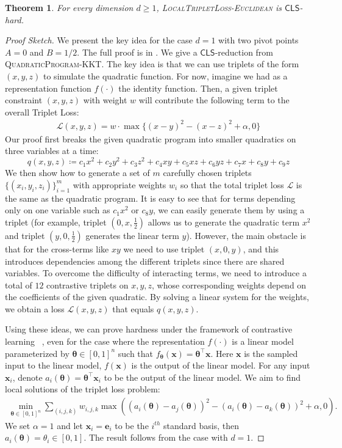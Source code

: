 \documentclass{article}
\theoremstyle{definition}  %
\theoremstyle{plain}
\newtheorem{theorem}{Theorem}
\numberwithin{observation}{section}
\numberwithin{claim}{section}
\numberwithin{fact}{section}
\numberwithin{lemma}{section}
\numberwithin{proposition}{section}
\numberwithin{theorem}{section}
\numberwithin{corollary}{section}
\numberwithin{definition}{section}
\def\ve{{\bm{e}}}
\def\vx{{\bm{x}}}
\newcommand{\vtheta}{\boldsymbol{\theta} }
\newcommand{\CLS}{\mathsf{CLS}}
\theoremstyle{plain}
\begin{document}
\begin{theorem} \label{thm:CLS_hard_contrastive}
For every dimension $d\ge1$, \textsc{LocalTripletLoss-Euclidean} is $\CLS$-hard. 
\end{theorem}
\begin{proof}[Proof Sketch] We present the key idea for the case $d=1$ with two pivot points $A = 0$ and $B = 1/2$. The full proof is in . 
We give a $\CLS$-reduction from \textsc{QuadraticProgram-KKT}. The key idea is that we can use triplets of the form $(x, y, z)$ to simulate the quadratic function. For now, imagine we had as a representation function $f(\cdot)$ the identity function. Then, a given triplet constraint $(x, y, z)$ with weight $w$ will contribute the following term to the overall Triplet Loss:
\begin{align*}
    \mathcal{L}(x,y,z) = w \cdot \max\{(x - y)^2 - (x - z)^2 + \alpha, 0\}
\end{align*}
Our proof first breaks the given quadratic program into smaller quadratics on three variables at a time:
\[
q(x, y, z) \coloneqq c_1 x^2 + c_2 y^2 + c_3 z^2 + c_4 xy + c_5 xz + c_6 yz + c_7 x + c_8 y + c_9 z
\]
We then show how to generate a set of $m$ carefully chosen triplets $\{(x_i, y_i, z_i)\}_{i=1}^m$ with appropriate weights $w_i$ so that the total triplet loss $\mathcal{L}$ is the same as the quadratic program. It is easy to see that for terms depending only on one variable such as $c_1x^2$ or $c_8 y$, we can easily generate them by using a triplet (for example, triplet $(0, x, \frac{1}{2})$ allows us to generate the quadratic term $x^2$ and triplet $(y, 0, \frac{1}{2})$ generates the linear term $y$). However, the main obstacle is that  for the cross-terms like $xy$ we need to use triplet $(x,0,y)$, and this introduces dependencies among the different triplets since there are shared variables. To overcome the difficulty of interacting terms, we need to introduce a total of $12$ contrastive triplets on $x,y,z$, whose corresponding weights depend on the coefficients of the given quadratic. By solving a linear system for the weights, we obtain a loss $\mathcal{L}(x,y,z)$ that equals $q(x, y, z)$.

Using these ideas, we can prove hardness under the framework of contrastive learning ~\citep{schroff2015facenet}, even for the case where the representation $f(\cdot)$ is a linear model parameterized by $\vtheta \in [0, 1]^n$ such that $f_{\vtheta}(\vx) = \vtheta^\top \vx$. Here $\vx$ is the sampled input to the linear model, $f(\vx)$ is the output of the linear model. For any input $\vx_i$, denote $a_i(\vtheta) = \vtheta^\top \vx_i$ to be the output of the linear model. We aim to find local solutions of the triplet loss problem:
\begin{align*}
    \min_{\vtheta \in [0, 1]^n} \sum_{(i, j, k)} w_{i, j, k} \max \left((a_i(\vtheta) - a_j(\vtheta))^2 - (a_i(\vtheta) - a_k(\vtheta))^2 + \alpha, 0 \right).
\end{align*}
We set $\alpha = 1$ and let $\vx_i = \ve_i$ to be the $i^{th}$ standard basis, then $a_i(\vtheta) = \theta_i \in [0, 1]$. The result follows from the case with $d = 1$.
\end{proof}
\end{document}
